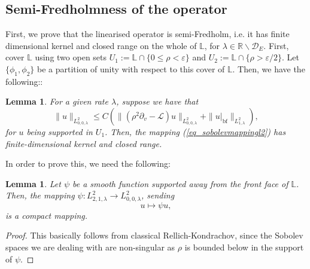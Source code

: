 \documentclass[10pt, a4paper]{article}
\theoremstyle{plain}%
\newtheorem{lem}[theorem]{Lemma}
\theoremstyle{definition}
\numberwithin{figure}{section}
\numberwithin{equation}{section}
\newcommand{\bL}{\mathbb{L}}
\newcommand{\bR}{\mathbb{R}}
\newcommand{\cD}{\mathcal{D}}
\begin{document}
\subsection{Semi-Fredholmness of the operator}
First, we prove that the linearised operator is semi-Fredholm, i.e$.$ it has finite dimensional kernel and closed range on the whole of $\bL$, for $\lambda \in \bR\backslash \cD_E$. First, cover $\bL$ using two open sets $U_1 := \mathbb{L} \cap \{ 0 \leq \rho < \varepsilon \}$ and $U_2 := \mathbb{L} \cap \{ \rho > \varepsilon/2 \}$. Let $\{\phi_1,\phi_2\}$ be a partition of unity with respect to this cover of $\mathbb{L}$. Then, we have the following::

\begin{lem}\label{lem_semiFredholm2}
	For a given rate $\lambda$, suppose we have that
	\begin{equation}\label{eq_l2estimate2}
		\|u\|_{L^2_{0,0,\lambda}} \leq C(\|(\rho^2\partial_v - \mathcal{L})u\|_{L^2_{0,0,\lambda}} + \|u|_{\mathrm{bf}}\|_{L^2_{1,\lambda}} ),
	\end{equation}
	for $u$ being supported in $U_1$. Then, the mapping (\ref{eq_sobolevmappingl2}) has finite-dimensional kernel and closed range.
\end{lem}

In order to prove this, we need the following:

\begin{lem}\label{lem_RK}
	Let $\psi$ be a smooth function supported away from the front face of $\mathbb{L}$. Then,  the mapping $\psi : L^2_{2,1,\lambda} \rightarrow L^2_{0,0,\lambda}$, sending
	\[
	u \mapsto \psi u,
	\]
	is a compact mapping.
\end{lem}
\begin{proof}
	This basically follows from classical Rellich-Kondrachov, since the Sobolev spaces we are dealing with are non-singular as $\rho$ is bounded below in the support of $\psi$.
\end{proof}
\end{document}
